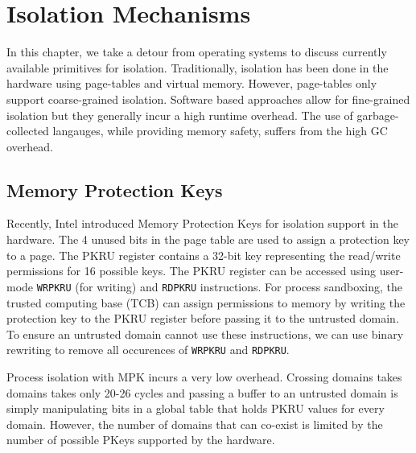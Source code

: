 \chapter{Isolation Mechanisms}

\label{Chapter3}

In this chapter, we take a detour from operating systems to discuss currently available primitives for isolation. Traditionally, isolation has been done in the hardware using page-tables and virtual memory. However, page-tables only support coarse-grained isolation. Software based approaches allow for fine-grained isolation but they generally incur a high runtime overhead. The use of garbage-collected langauges, while providing memory safety, suffers from the high GC overhead. 

\section{Memory Protection Keys}

Recently, Intel introduced Memory Protection Keys \cite{mpk} for isolation support in the hardware. The 4 unused bits in the page table are used to assign a protection key to a page.  The PKRU register contains a 32-bit key representing the read/write permissions for 16 possible keys. The PKRU register can be accessed using user-mode \lstinline{WRPKRU} (for writing) and \lstinline{RDPKRU} instructions. For process sandboxing, the trusted computing base (TCB) can assign permissions to memory by writing the protection key to the PKRU register before passing it to the untrusted domain. To ensure an untrusted domain cannot use these instructions, we can use binary rewriting to remove all occurences of \lstinline{WRPKRU} and \lstinline{RDPKRU}.

Process isolation with MPK incurs a very low overhead. Crossing domains takes domains takes only 20-26 cycles \cite{mpk-cycles} and passing a buffer to an untrusted domain is simply manipulating bits in a global table that holds PKRU values for every domain. However, the number of domains that can co-exist is limited by the number of possible PKeys supported by the hardware.

